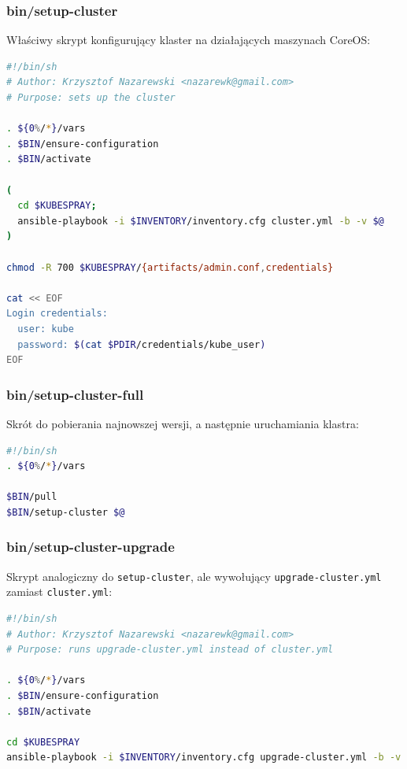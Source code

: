 \documentclass[a4paper,12pt,twoside,openany]{report}
\newcommand{\passthrough}[1]{#1}
\begin{document}
\hypertarget{binsetup-cluster}{%
\subsubsection{bin/setup-cluster}\label{binsetup-cluster}}

Właściwy skrypt konfigurujący klaster na działających maszynach CoreOS:

\begin{lstlisting}[language=bash]
#!/bin/sh
# Author: Krzysztof Nazarewski <nazarewk@gmail.com>
# Purpose: sets up the cluster

. ${0%/*}/vars
. $BIN/ensure-configuration
. $BIN/activate

(
  cd $KUBESPRAY;
  ansible-playbook -i $INVENTORY/inventory.cfg cluster.yml -b -v $@
)

chmod -R 700 $KUBESPRAY/{artifacts/admin.conf,credentials}

cat << EOF
Login credentials:
  user: kube
  password: $(cat $PDIR/credentials/kube_user)
EOF
\end{lstlisting}

\hypertarget{binsetup-cluster-full}{%
\subsubsection{bin/setup-cluster-full}\label{binsetup-cluster-full}}

Skrót do pobierania najnowszej wersji, a następnie uruchamiania klastra:

\begin{lstlisting}[language=bash]
#!/bin/sh
. ${0%/*}/vars

$BIN/pull
$BIN/setup-cluster $@
\end{lstlisting}

\hypertarget{binsetup-cluster-upgrade}{%
\subsubsection{bin/setup-cluster-upgrade}\label{binsetup-cluster-upgrade}}

Skrypt analogiczny do \passthrough{\lstinline!setup-cluster!}, ale
wywołujący \passthrough{\lstinline!upgrade-cluster.yml!} zamiast
\passthrough{\lstinline!cluster.yml!}:

\begin{lstlisting}[language=bash]
#!/bin/sh
# Author: Krzysztof Nazarewski <nazarewk@gmail.com>
# Purpose: runs upgrade-cluster.yml instead of cluster.yml

. ${0%/*}/vars
. $BIN/ensure-configuration
. $BIN/activate

cd $KUBESPRAY
ansible-playbook -i $INVENTORY/inventory.cfg upgrade-cluster.yml -b -v $@
\end{lstlisting}
\end{document}
